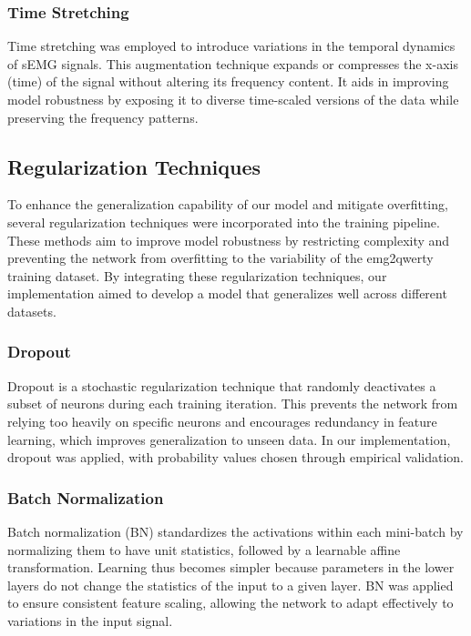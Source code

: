\documentclass{article}
\begin{document}
\subsubsection{Time Stretching}
Time stretching was employed to introduce variations in the temporal dynamics of sEMG signals. This augmentation technique expands or compresses the x-axis (time) of the signal without altering its frequency content. It aids in improving model robustness by exposing it to diverse time-scaled versions of the data while preserving the frequency patterns.
\subsection{Regularization Techniques}
To enhance the generalization capability of our model and mitigate overfitting, several regularization techniques were incorporated into the training pipeline. These methods aim to improve model robustness by restricting complexity and preventing the network from overfitting to the variability of the emg2qwerty training dataset. By integrating these regularization techniques, our implementation aimed to develop a model that generalizes well across different datasets.
\subsubsection{Dropout}
Dropout is a stochastic regularization technique that randomly deactivates a subset of neurons during each training iteration. This prevents the network from relying too heavily on specific neurons and encourages redundancy in feature learning, which improves generalization to unseen data. In our implementation, dropout was applied, with probability values chosen through empirical validation.
\subsubsection{Batch Normalization}
Batch normalization (BN) standardizes the activations within each mini-batch by normalizing them to have unit statistics, followed by a learnable affine transformation. Learning thus becomes simpler because parameters in the lower layers do not change the statistics of the input to a given layer. BN was applied to ensure consistent feature scaling, allowing the network to adapt effectively to variations in the input signal.
\end{document}
